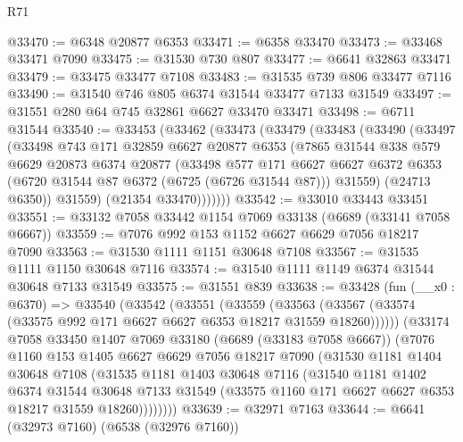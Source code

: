 \begin{lexlean}{R71}
\begin{coremodule}
@33470 := @6348 @20877 @6353
@33471 := @6358 @33470
@33473 := @33468 @33471 @7090
@33475 := @31530 @730 @807
@33477 := @6641 @32863 @33471
@33479 := @33475 @33477 @7108
@33483 := @31535 @739 @806 @33477 @7116
@33490 := @31540 @746 @805 @6374 @31544 @33477 @7133 @31549
@33497 := @31551 @280 @64 @745 @32861 @6627 @33470 @33471
@33498 := @6711 @31544
@33540 := @33453
    (@33462
      (@33473
        (@33479
          (@33483
            (@33490
              (@33497
                (@33498
                  @743
                  @171
                  @32859
                  @6627
                  @20877
                  @6353
                  (@7865
                    @31544
                    @338
                    @579
                    @6629
                    @20873
                    @6374
                    @20877
                    (@33498
                      @577
                      @171
                      @6627
                      @6627
                      @6372
                      @6353
                      (@6720 @31544 @87 @6372 (@6725 (@6726 @31544 @87)))
                      @31559)
                    (@24713 @6350))
                  @31559)
                (@21354 @33470)))))))
@33542 := @33010 @33443 @33451
@33551 := @33132 @7058 @33442 @1154 @7069 @33138 (@6689 (@33141 @7058 @6667))
@33559 := @7076 @992 @153 @1152 @6627 @6629 @7056 @18217 @7090
@33563 := @31530 @1111 @1151 @30648 @7108
@33567 := @31535 @1111 @1150 @30648 @7116
@33574 := @31540 @1111 @1149 @6374 @31544 @30648 @7133 @31549
@33575 := @31551 @839
@33638 := @33428
    (fun (__x0 : @6370) =>
    @33540
      (@33542
        (@33551
          (@33559
            (@33563 (@33567 (@33574 (@33575 @992 @171 @6627 @6627 @6353 @18217 @31559 @18260))))))
        (@33174
          @7058
          @33450
          @1407
          @7069
          @33180
          (@6689 (@33183 @7058 @6667))
          (@7076
            @1160
            @153
            @1405
            @6627
            @6629
            @7056
            @18217
            @7090
            (@31530
              @1181
              @1404
              @30648
              @7108
              (@31535
                @1181
                @1403
                @30648
                @7116
                (@31540
                  @1181
                  @1402
                  @6374
                  @31544
                  @30648
                  @7133
                  @31549
                  (@33575 @1160 @171 @6627 @6627 @6353 @18217 @31559 @18260))))))))
@33639 := @32971 @7163
@33644 := @6641 (@32973 @7160) (@6538 (@32976 @7160))

\end{coremodule}
\end{lexlean}
